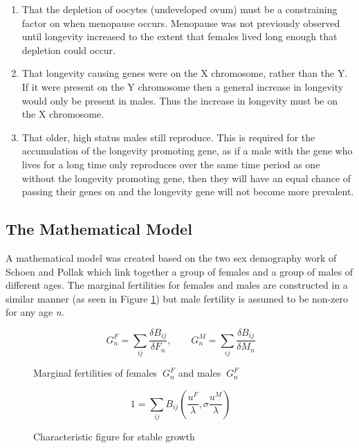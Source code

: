 \documentclass[authoryearcitations]{UoYCSproject}
\begin{document}
\begin{enumerate}
\item That the depletion of oocytes (undeveloped ovum) must be a constraining factor on when menopause occurs. Menopause was not previously observed until longevity increased to the extent that females lived long enough that depletion could occur.

\item That longevity causing genes were on the X chromosome, rather than the Y. If it were present on the Y chromosome then a general increase in longevity would only be present in males. Thus the increase in longevity must be on the X chromosome.

\item That older, high status males still reproduce. This is required for the accumulation of the longevity promoting gene, as if a male with the gene who lives for a long time only reproduces over the same time period as one without the longevity promoting gene, then they will have an equal chance of passing their genes on and the longevity gene will not become more prevalent.

\end{enumerate}


\subsection{The Mathematical Model}
A mathematical model was created \cite{whyMenMatter2007} based on the two sex demography work of Schoen and Pollak \cite{schoen1981harmonic, pollak1990two} which link together a group of females and a group of males of different ages. The marginal fertilities for females and males are constructed in a similar manner (as seen in Figure \ref{fig:marginalFertilities}) but male fertility is assumed to be non-zero for any age \textit{n}. 

\begin{figure}[h]
$$\ G^F_n = \sum_{ij} \frac{\delta B_{ij}}{\delta F_n}, \qquad G^M_n = \sum_{ij} \frac{\delta B_{ij}}{\delta M_n}$$
\caption{Marginal fertilities of females $\ G_n^F $ and males $\ G_n^F $ }
\label{fig:marginalFertilities}
\end{figure}


\begin{figure}[h]
$$\ 1 = \sum_{ij} B_{ij}(\frac{u^F}{\lambda}, \sigma\frac{u^M}{\lambda}) $$
\caption{Characteristic figure for stable growth}
\label{fig:stableGrowth}
\end{figure}
\end{document}
